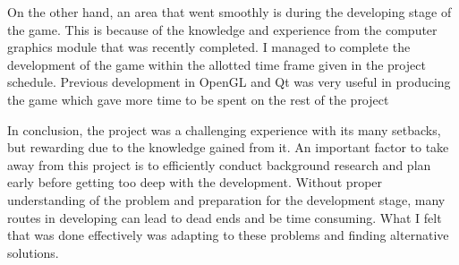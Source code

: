 \newline
\par
On the other hand, an area that went smoothly is during the developing stage of the game. This is because of the knowledge and experience from the computer graphics module that was recently completed. I managed to complete the development of the game within the allotted time frame given in the project schedule. Previous development in OpenGL and Qt was very useful in producing the game which gave more time to be spent on the rest of the project
\newline
\par
In conclusion, the project was a challenging experience with its many setbacks, but rewarding due to the knowledge gained from it. An important factor to take away from this project is to efficiently conduct background research and plan early before getting too deep with the development. Without proper understanding of the problem and preparation for the development stage, many routes in developing can lead to dead ends and be time consuming. What I felt that was done effectively was adapting to these problems and finding alternative solutions.